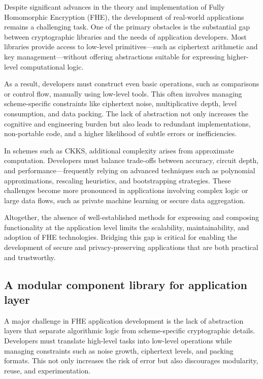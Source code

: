 \documentclass[article]{iacrtrans}
\begin{document}
Despite significant advances in the theory and implementation of Fully Homomorphic Encryption (FHE), the development of real-world applications remains a challenging task. One of the primary obstacles is the substantial gap between cryptographic libraries and the needs of application developers. Most libraries provide access to low-level primitives—such as ciphertext arithmetic and key management—without offering abstractions suitable for expressing higher-level computational logic.

As a result, developers must construct even basic operations, such as comparisons or control flow, manually using low-level tools. This often involves managing scheme-specific constraints like ciphertext noise, multiplicative depth, level consumption, and data packing. The lack of abstraction not only increases the cognitive and engineering burden but also leads to redundant implementations, non-portable code, and a higher likelihood of subtle errors or inefficiencies.

In schemes such as CKKS, additional complexity arises from approximate computation. Developers must balance trade-offs between accuracy, circuit depth, and performance—frequently relying on advanced techniques such as polynomial approximations, rescaling heuristics, and bootstrapping strategies. These challenges become more pronounced in applications involving complex logic or large data flows, such as private machine learning or secure data aggregation.

Altogether, the absence of well-established methods for expressing and composing functionality at the application level limits the scalability, maintainability, and adoption of FHE technologies. Bridging this gap is critical for enabling the development of secure and privacy-preserving applications that are both practical and trustworthy.


\subsection{A modular component library for application layer}

A major challenge in FHE application development is the lack of abstraction layers that separate algorithmic logic from scheme-specific cryptographic details. Developers must translate high-level tasks into low-level operations while managing constraints such as noise growth, ciphertext levels, and packing formats. This not only increases the risk of error but also discourages modularity, reuse, and experimentation.
\end{document}
